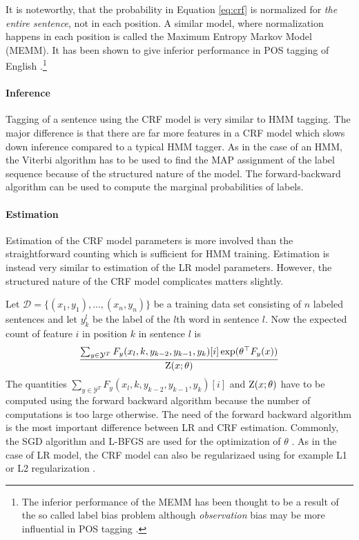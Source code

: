 It is noteworthy, that the probability in Equation \ref{eq:crf} is
normalized for {\it the entire sentence}, not in each position. A
similar model, where normalization happens in each position is called
the Maximum Entropy Markov Model (MEMM). It has been shown to give
inferior performance in POS tagging of English
\citep{Lafferty2001}.\footnote{The inferior performance of the MEMM has
  been thought to be a result of the so called label bias problem
  \citep{Lafferty2001} although {\it observation} bias may be more
  influential in POS tagging \citep{Klein2002}.}

\paragraph{Inference} Tagging of a sentence using the CRF model is
very similar to HMM tagging. The major difference is that there are
far more features in a CRF model which slows down inference compared
to a typical HMM tagger. As in the case of an HMM, the Viterbi
algorithm has to be used to find the MAP assignment of the label
sequence because of the structured nature of the model. The
forward-backward algorithm can be used to compute the marginal
probabilities of labels.

\paragraph{Estimation} Estimation of the CRF model parameters is more
involved than the straightforward counting which is sufficient for HMM
training. Estimation is instead very similar to estimation of the LR
model parameters. However, the structured nature of the CRF model
complicates matters slightly.

Let $\mathcal{D} = \{(x_1, y_1), ..., (x_n, y_n)\}$ be a training data
set consisting of $n$ labeled sentences and let $y_k^l$ be the label
of the $l$th word in sentence $l$. Now the expected count of feature
$i$ in position $k$ in sentence $l$ is
$$\frac{\sum_{y \in \mathcal{Y}^T}F_y(x_l, k, y_{k - 2}, y_{k-1}, y_k)[i] \exp(\theta^\top F_y(x))}{\mbox{${\rm Z}$}(x\mbox{$ ; \, $}\theta)}$$
The quantities $\sum_{y \in \mathcal{Y}^T}F_y(x_l, k, y_{k - 2},
y_{k-1}, y_k)[i]$ and $\mbox{${\rm Z}$}(x\mbox{$ ; \, $}\theta)$ have to be computed using
the forward backward algorithm because the number of computations is
too large otherwise. The need of the forward backward algorithm is the
most important difference between LR and CRF estimation.  Commonly,
the SGD algorithm and L-BFGS are used for the optimization of $\theta$
\citep{Vishwanathan2006}. As in the case of LR model, the CRF model
can also be regularizaed using for example L1 or L2 regularization
\cite{Sutton2006}.

